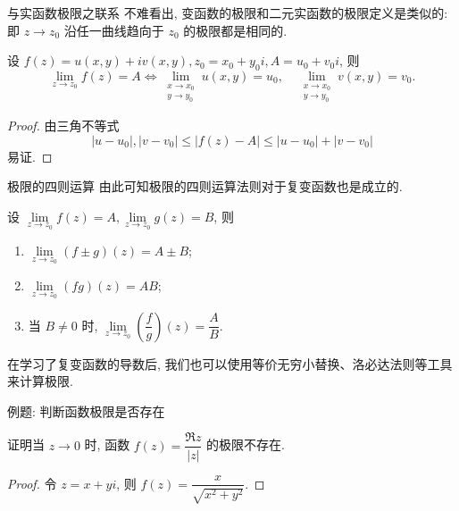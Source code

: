 \begin{frame}{与实函数极限之联系}
	\onslide<+->
	不难看出, 变函数的极限和二元实函数的极限定义是类似的:
	\onslide<+->
	即 $z\to z_0$ 沿任一曲线趋向于 $z_0$ 的极限都是相同的.

	\onslide<+->
	\begin{theorem}
		设 $f(z)=u(x,y)+iv(x,y),z_0=x_0+y_0i,A=u_0+v_0i$, 则
		\[\lim_{z\to z_0}f(z)=A\iff
		\lim_{\substack{x\to x_0\\y\to y_0}}u(x,y)=u_0,\quad
		\lim_{\substack{x\to x_0\\y\to y_0}}v(x,y)=v_0.\]
		\vspace{-0.5\baselineskip}
	\end{theorem}

	\onslide<+->
	\begin{proof}
		由三角不等式
		\[|u-u_0|,|v-v_0|\le|f(z)-A|\le|u-u_0|+|v-v_0|\]
		易证.
	\end{proof}
\end{frame}


\begin{frame}{极限的四则运算}
	\onslide<+->
	由此可知极限的四则运算法则对于复变函数也是成立的.

	\onslide<+->
	\begin{theorem}
		设 $\lim\limits_{z\to z_0}f(z)=A,\lim\limits_{z\to z_0}g(z)=B$, 则
		\begin{enumerate}
			\item $\lim\limits_{z\to z_0}(f\pm g)(z)=A\pm B$;
			\item $\lim\limits_{z\to z_0}(fg)(z)=AB$;
			\item 当 $B\neq 0$ 时, $\lim\limits_{z\to z_0}\left(\dfrac fg\right)(z)=\dfrac AB$.
		\end{enumerate}
	\end{theorem}

	\onslide<+->
	在学习了复变函数的导数后, 我们也可以使用等价无穷小替换、洛必达法则等工具来计算极限.
\end{frame}


\begin{frame}{例题: 判断函数极限是否存在}
	\onslide<+->
	\begin{example}
		证明当 $z\to0$ 时, 函数 $f(z)=\dfrac{\Re z}{|z|}$ 的极限不存在.
	\end{example}

	\onslide<+->
	\begin{proof}
		令 $z=x+yi$, 则 $f(z)=\dfrac x{\sqrt{x^2+y^2}}$.
		\onslide<+->{因此
			\[u(x,y)=\frac x{\sqrt{x^2+y^2}},\quad v(x,y)=0.\]}

	\end{proof}
\end{frame}


